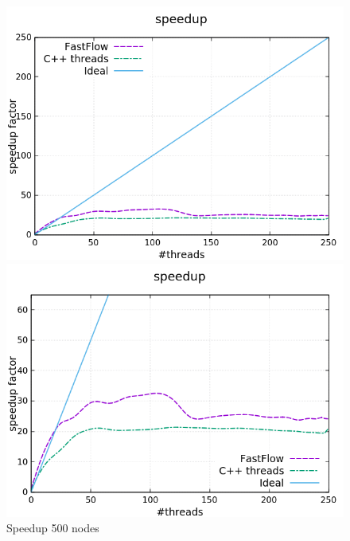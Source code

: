 \begin{figure}[H]
	\centering
	\begin{minipage}[t]{0.50\linewidth}
		\includegraphics[width=\linewidth]{benchmark/curves/speedup_standard_500_20000.png}
		\vspace{0.2em}
	\end{minipage}%
	\begin{minipage}[t]{0.50\linewidth}
		\includegraphics[width=\linewidth]{benchmark/curves/speedup_zoom_500_20000.png}
	\end{minipage}
	\caption{Speedup 500 nodes}\label{fig:speedup500}
\end{figure}


